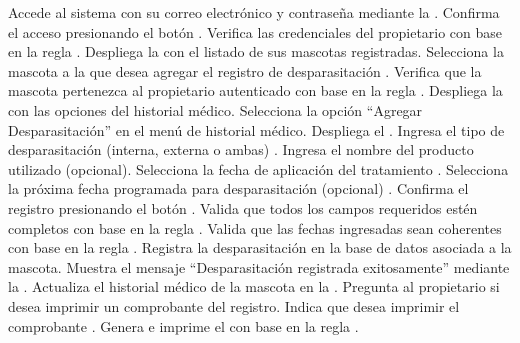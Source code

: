 \begin{UCtrayectoria}
    \UCpaso[\UCactor] Accede al sistema con su correo electrónico y contraseña mediante la \label{CU08Login}.
    \UCpaso[\UCactor] Confirma el acceso presionando el botón .
    \UCpaso Verifica las credenciales del propietario con base en la regla .
    \UCpaso Despliega la  con el listado de sus mascotas registradas.
    \UCpaso[\UCactor] Selecciona la mascota a la que desea agregar el registro de desparasitación \label{CU08SeleccionarMascota}.
    \UCpaso Verifica que la mascota pertenezca al propietario autenticado con base en la regla  .
    \UCpaso Despliega la  con las opciones del historial médico.
    \UCpaso[\UCactor] Selecciona la opción ``Agregar Desparasitación'' en el menú de historial médico.
    \UCpaso Despliega el .
    \UCpaso[\UCactor] Ingresa el tipo de desparasitación (interna, externa o ambas) .
    \UCpaso[\UCactor] Ingresa el nombre del producto utilizado (opcional).
    \UCpaso[\UCactor] Selecciona la fecha de aplicación del tratamiento .
    \UCpaso[\UCactor] Selecciona la próxima fecha programada para desparasitación (opcional) .
    \UCpaso[\UCactor] Confirma el registro presionando el botón .
    \UCpaso Valida que todos los campos requeridos estén completos con base en la regla  .
    \UCpaso Valida que las fechas ingresadas sean coherentes con base en la regla  .
    \UCpaso Registra la desparasitación en la base de datos asociada a la mascota.
    \UCpaso Muestra el mensaje ``Desparasitación registrada exitosamente'' mediante la .
    \UCpaso Actualiza el historial médico de la mascota en la .
    \UCpaso Pregunta al propietario si desea imprimir un comprobante del registro.
    \UCpaso[\UCactor] Indica que desea imprimir el comprobante .
    \UCpaso Genera e imprime el  con base en la regla .
\end{UCtrayectoria}

